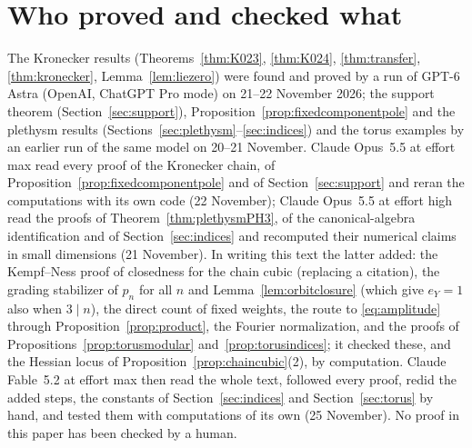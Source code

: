 \documentclass[11pt,a4paper]{article}
\theoremstyle{definition}
\begin{document}
\section{Who proved and checked what}\label{sec:provenance}

The Kronecker results (Theorems~\ref{thm:K023}, \ref{thm:K024},
\ref{thm:transfer}, \ref{thm:kronecker}, Lemma~\ref{lem:liezero}) were found
and proved by a run of GPT-6 Astra (OpenAI, ChatGPT Pro mode) on 21--22
November 2026; the support theorem (Section~\ref{sec:support}),
Proposition~\ref{prop:fixedcomponentpole} and the plethysm results
(Sections~\ref{sec:plethysm}--\ref{sec:indices}) and the torus examples by an
earlier run of the same model on 20--21 November. Claude Opus~5.5 at effort max
read every proof of the Kronecker chain, of
Proposition~\ref{prop:fixedcomponentpole} and of Section~\ref{sec:support} and
reran the computations with its own code (22 November); Claude Opus~5.5 at
effort high read the proofs of Theorem~\ref{thm:plethysmPH3}, of the
canonical-algebra identification and of Section~\ref{sec:indices} and recomputed
their numerical claims in small dimensions (21 November). In writing this text
the latter added: the Kempf--Ness proof of closedness for the chain cubic
(replacing a citation), the grading stabilizer of $p_n$ for all $n$ and
Lemma~\ref{lem:orbitclosure} (which give $e_Y=1$ also when $3\mid n$), the
direct count of fixed weights, the route to \eqref{eq:amplitude} through
Proposition~\ref{prop:product}, the Fourier normalization, and the proofs of
Propositions~\ref{prop:torusmodular} and~\ref{prop:torusindices}; it checked
these, and the Hessian locus of Proposition~\ref{prop:chaincubic}(2), by
computation. Claude Fable~5.2 at effort max then read the whole text,
followed every proof, redid the added steps, the constants of
Section~\ref{sec:indices} and Section~\ref{sec:torus} by hand, and tested them
with computations of its own (25 November). No proof in this paper has been
checked by a human.
\end{document}
